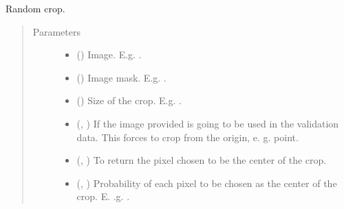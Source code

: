 \documentclass[letterpaper,10pt,english]{sphinxmanual}
\begin{document}
\begin{fulllineitems}
\label{\detokenize{data/data_2d_manipulation:data.data_2D_manipulation.random_crop}}
Random crop.
\begin{quote}\begin{description}
\item[{Parameters}] \leavevmode\begin{itemize}
\item {} 
 () \textendash{} Image. E.g. .

\item {} 
 () \textendash{} Image mask. E.g. .

\item {} 
 () \textendash{} Size of the crop. E.g. .

\item {} 
 (, ) \textendash{} If the image provided is going to be used in the validation data. This forces to crop from the origin,
e. g.  point.

\item {} 
 (, ) \textendash{} To return the pixel chosen to be the center of the crop.

\item {} 
 (, ) \textendash{} Probability of each pixel to be chosen as the center of the crop. E. .g. .


\end{itemize}
\end{description}
\end{quote}
\end{fulllineitems}
\end{document}

